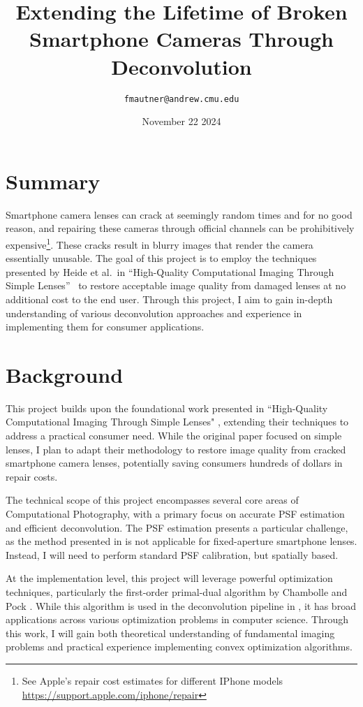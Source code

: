 \documentclass{article}
\title{Extending the Lifetime of Broken Smartphone Cameras Through Deconvolution}
\author{\texttt{fmautner@andrew.cmu.edu}}
\date{November 22 2024}
\begin{document}
\setlength{\droptitle}{-1in} %
\maketitle

\section{Summary}
Smartphone camera lenses can crack at seemingly random times and for no good reason, and repairing these cameras through official channels can be prohibitively expensive\footnote{See Apple's repair cost estimates for different IPhone models \url{https://support.apple.com/iphone/repair}}. These cracks result in blurry images that render the camera essentially unusable. The goal of this project is to employ the techniques presented by Heide et al.\ in ``High-Quality Computational Imaging Through Simple Lenses''~\cite{simplelens} to restore acceptable image quality from damaged lenses at no additional cost to the end user. Through this project, I aim to gain in-depth understanding of various deconvolution approaches and experience in implementing them for consumer applications.



\section{Background}
This project builds upon the foundational work presented in ``High-Quality Computational Imaging Through Simple Lenses" \cite{simplelens}, extending their techniques to address a practical consumer need. While the original paper focused on simple lenses, I plan to adapt their methodology to restore image quality from cracked smartphone camera lenses, potentially saving consumers hundreds of dollars in repair costs.

The technical scope of this project encompasses several core areas of Computational Photography, with a primary focus on accurate PSF estimation and efficient deconvolution. The PSF estimation presents a particular challenge, as the method presented in \cite{simplelens} is not applicable for fixed-aperture smartphone lenses. Instead, I will need to perform standard PSF calibration, but spatially based.

At the implementation level, this project will leverage powerful optimization techniques, particularly the first-order primal-dual algorithm by Chambolle and Pock \cite{Chambolle2011AFP}. While this algorithm is used in the deconvolution pipeline in \cite{simplelens}, it has broad applications across various optimization problems in computer science. Through this work, I will gain both theoretical understanding of fundamental imaging problems and practical experience implementing convex optimization algorithms.
\end{document}
